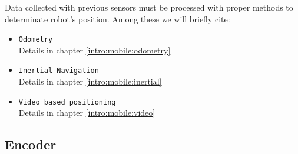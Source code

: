 Data collected with previous sensors must be processed with proper methods to
determinate robot's position. Among these we will briefly cite: 
\begin{itemize}
\item \texttt{Odometry} \\
  Details in chapter \ref{intro:mobile:odometry}
\item \texttt{Inertial Navigation} \\
  Details in chapter \ref{intro:mobile:inertial}
\item \texttt{Video based positioning} \\
  Details in chapter \ref{intro:mobile:video}
\end{itemize}


\subsection{Encoder}
\label{intro:mobile:encoder}

